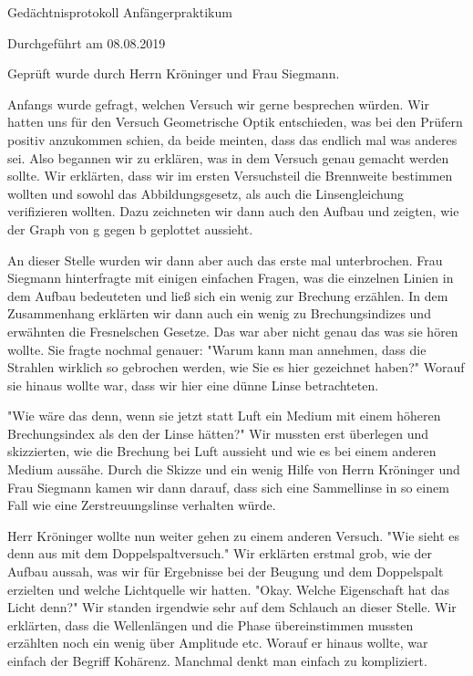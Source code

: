 
Gedächtnisprotokoll Anfängerpraktikum

Durchgeführt am 08.08.2019

Geprüft wurde durch Herrn Kröninger und Frau Siegmann.

Anfangs wurde gefragt, welchen Versuch wir gerne besprechen würden. Wir hatten uns für den Versuch Geometrische Optik entschieden, was bei den Prüfern positiv anzukommen schien, da beide meinten, dass das endlich mal was anderes sei. 
Also begannen wir zu erklären, was in dem Versuch genau gemacht werden sollte. Wir erklärten, dass wir im ersten Versuchsteil die Brennweite bestimmen wollten und sowohl das Abbildungsgesetz, als auch die Linsengleichung verifizieren wollten. Dazu zeichneten wir dann auch den Aufbau und zeigten, wie der Graph von g gegen b geplottet aussieht. 

An dieser Stelle wurden wir dann aber auch das erste mal unterbrochen. Frau Siegmann hinterfragte mit einigen einfachen Fragen, was die einzelnen Linien in dem Aufbau bedeuteten und ließ sich ein wenig zur Brechung erzählen. In dem Zusammenhang erklärten wir dann auch ein wenig zu Brechungsindizes und erwähnten die Fresnelschen Gesetze. Das war aber nicht genau das was sie hören wollte. Sie fragte nochmal genauer: "Warum kann man annehmen, dass die Strahlen wirklich so gebrochen werden, wie Sie es hier gezeichnet haben?" Worauf sie hinaus wollte war, dass wir hier eine dünne Linse betrachteten.

"Wie wäre das denn, wenn sie jetzt statt Luft ein Medium mit einem höheren Brechungsindex als den der Linse hätten?"
Wir mussten erst überlegen und skizzierten, wie die Brechung bei Luft aussieht und wie es bei einem anderen Medium aussähe. Durch die Skizze und ein wenig Hilfe von Herrn Kröninger und Frau Siegmann kamen wir dann darauf, dass sich eine Sammellinse in so einem Fall wie eine Zerstreuungslinse verhalten würde.

Herr Kröninger wollte nun weiter gehen zu einem anderen Versuch. "Wie sieht es denn aus mit dem Doppelspaltversuch." Wir erklärten erstmal grob, wie der Aufbau aussah, was wir für Ergebnisse bei der Beugung und dem Doppelspalt erzielten und welche Lichtquelle wir hatten. 
"Okay. Welche Eigenschaft hat das Licht denn?" Wir standen irgendwie sehr auf dem Schlauch an dieser Stelle. Wir erklärten, dass die Wellenlängen und die Phase übereinstimmen mussten erzählten noch ein wenig über Amplitude etc. Worauf er hinaus wollte, war einfach der Begriff Kohärenz. Manchmal denkt man einfach zu kompliziert.

